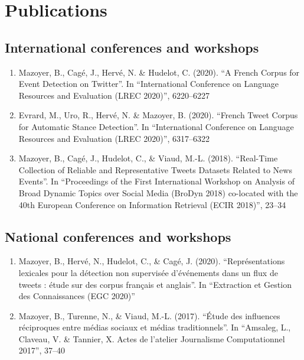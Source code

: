 \chapter*{Publications}

\section*{International conferences and workshops}
\begin{enumerate}
    \item Mazoyer, B., Cagé, J., Hervé, N. \& Hudelot, C. (2020). “A French Corpus for Event Detection on Twitter”. In “International Conference on Language Resources and Evaluation (LREC 2020)”, 6220–6227
    
    \item Evrard, M., Uro, R., Hervé, N. \& Mazoyer, B. (2020). “French Tweet Corpus for Automatic Stance Detection”. In “International Conference on Language Resources and Evaluation (LREC 2020)”, 6317–6322
    
    \item Mazoyer, B., Cagé, J., Hudelot, C., \& Viaud, M.-L. (2018). “Real-Time Collection of Reliable and Representative Tweets Datasets Related to News Events”. In “Proceedings of the First International Workshop on Analysis of Broad Dynamic Topics over Social Media (BroDyn 2018) co-located with the 40th European Conference on Information Retrieval (ECIR 2018)”, 23–34
\end{enumerate}

\section*{National conferences and workshops}
\begin{enumerate}
    \item Mazoyer, B., Hervé, N., Hudelot, C., \& Cagé, J. (2020). “Représentations lexicales pour la détection non supervisée d’événements dans un flux de tweets : étude sur des corpus français et anglais”. In “Extraction et Gestion des Connaissances (EGC 2020)”
    
    \item Mazoyer, B., Turenne, N., \& Viaud, M.-L. (2017). “Étude des influences réciproques entre médias sociaux et médias traditionnels”. In “Amsaleg, L., Claveau, V. \& Tannier, X. Actes de l’atelier Journalisme Computationnel 2017”, 37–40
\end{enumerate}

